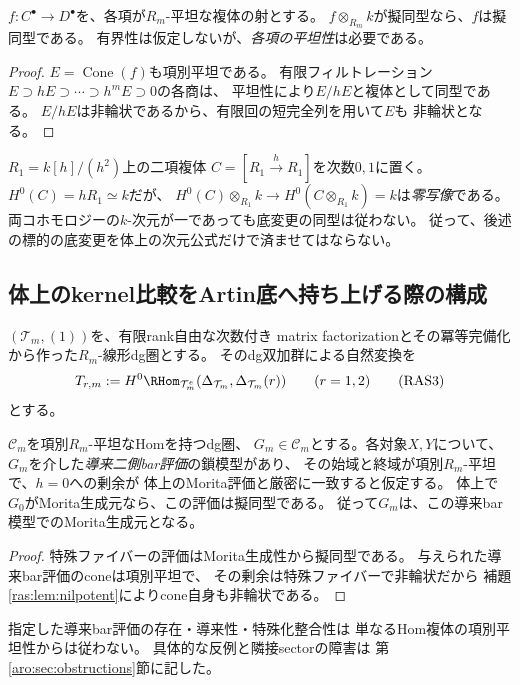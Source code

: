 \begin{lemma}[有限nilpotent比較の検出]\label{ras:lem:nilpotent}
$f:C^\bullet\to D^\bullet$を、各項が$R_m$-平坦な複体の射とする。
$f\otimes_{R_m}k$が擬同型なら、$f$は擬同型である。
有界性は仮定しないが、\emph{各項の平坦性}は必要である。
\end{lemma}
\begin{proof}
$E=\operatorname{Cone}(f)$も項別平坦である。
有限フィルトレーション
$E\supset hE\supset\cdots\supset h^mE\supset0$の各商は、
平坦性により$E/hE$と複体として同型である。
$E/hE$は非輪状であるから、有限回の短完全列を用いて$E$も
非輪状となる。
\end{proof}

\begin{example}[特殊ファイバーの次元だけでは足りない]
\label{ras:ex:basechange-fails}
$R_1=k[h]/(h^2)$上の二項複体
$C=[R_1\xrightarrow{h}R_1]$を次数$0,1$に置く。
$H^0(C)=hR_1\simeq k$だが、
$H^0(C)\otimes_{R_1}k\to H^0(C\otimes_{R_1}k)=k$は\emph{零写像}である。
両コホモロジーの$k$-次元が一であっても底変更の同型は従わない。
従って、後述の標的の底変更を体上の次元公式だけで済ませてはならない。
\end{example}

\subsection{体上のkernel比較をArtin底へ持ち上げる際の構成}

$(\mathcal T_m,(1))$を、有限rank自由な次数付き
matrix factorizationとその冪等完備化から作った$R_m$-線形dg圏とする。
そのdg双加群による自然変換を
\[
 T_{r,m}:=H^0\RHom_{\mathcal T_m^e}
 (\Delta_{\mathcal T_m},\Delta_{\mathcal T_m}(r))
 \qquad(r=1,2)
 \tag{RAS3}\label{ras:eq:target}
\]
とする。

\begin{lemma}[導来bar評価の条件付き持上げ]\label{ras:lem:generator}
$\mathcal C_m$を項別$R_m$-平坦なHomを持つdg圏、
$G_m\in\mathcal C_m$とする。各対象$X,Y$について、
$G_m$を介した\emph{導来二側bar評価}の鎖模型があり、
その始域と終域が項別$R_m$-平坦で、$h=0$への剰余が
体上のMorita評価と厳密に一致すると仮定する。
体上で$G_0$がMorita生成元なら、この評価は擬同型である。
従って$G_m$は、この導来bar模型でのMorita生成元となる。
\end{lemma}
\begin{proof}
特殊ファイバーの評価はMorita生成性から擬同型である。
与えられた導来bar評価のconeは項別平坦で、
その剰余は特殊ファイバーで非輪状だから
補題\ref{ras:lem:nilpotent}によりcone自身も非輪状である。
\end{proof}
\begin{remark}[一般の特殊生成子持上げは偽]
指定した導来bar評価の存在・導来性・特殊化整合性は
単なるHom複体の項別平坦性からは従わない。
具体的な反例と隣接sectorの障害は
第\ref{aro:sec:obstructions}節に記した。
\end{remark}

